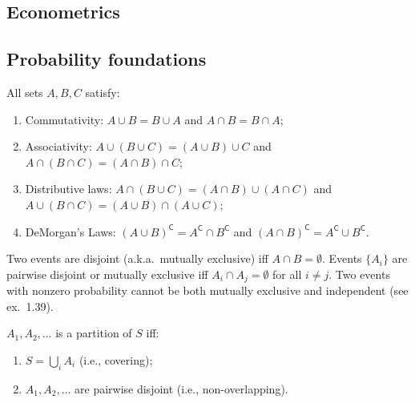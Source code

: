 \documentclass[8pt,letterpaper, landscape]{extarticle} %
\begin{document}
\begin{multicols}{3}
\section{Econometrics}
\begin{description}
\subsection{Probability foundations}
 All sets $ A, B, C $ satisfy:
\begin{enumerate}
\item Commutativity: $ A \cup B = B \cup A $ and $ A \cap B = B \cap A $;
\item Associativity: $ A \cup (B \cup C) = (A \cup B) \cup C $ and $ A \cap (B \cap C) = (A \cap B) \cap C $;
\item Distributive laws: $ A \cap (B \cup C) = (A \cap B) \cup (A \cap C) $ and $ A \cup (B \cap C) = (A \cup B) \cap (A \cup C) $;
\item DeMorgan's Laws: $ (A \cup B)^{\mathsf{C}} = A^{\mathsf{C}} \cap B^{\mathsf{C}} $ and $ (A \cap B)^{\mathsf{C}} = A^{\mathsf{C}} \cup B^{\mathsf{C}} $.
\end{enumerate}

 Two events are disjoint (a.k.a.\ mutually exclusive) iff $ A \cap B = \emptyset $. Events $ \{ A_i \} $ are pairwise disjoint or mutually exclusive iff $ A_i \cap A_j = \emptyset $ for all $ i \neq j $. Two events with nonzero probability cannot be both mutually exclusive and independent (see ex.~1.39).

 $ A_1, A_2, \dotsc $ is a partition of $ S $ iff:
\begin{enumerate}
\item $ S = \bigcup_i A_i $ (i.e., covering);
\item $ A_1, A_2, \dotsc $ are pairwise disjoint (i.e., non-overlapping).
\end{enumerate}


\end{description}
\end{multicols}
\end{document}
